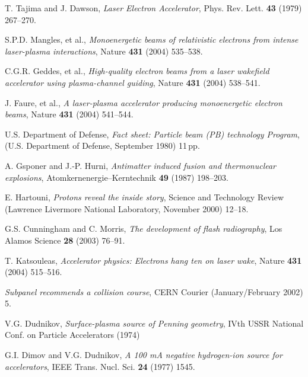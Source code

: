 \documentclass [12pt,a4paper,     ]{report} %
\begin{document}
\begin{enumerate}

   T. Tajima and J. Dawson, \emph{Laser Electron Accelerator}, Phys. Rev. Lett. {\bf 43} (1979) 267--270. 

 S.P.D. Mangles, et al., \emph{Monoenergetic beams of relativistic electrons from intense laser-plasma interactions}, Nature {\bf 431} (2004) 535--538.

 C.G.R. Geddes, et al., \emph{High-quality electron beams from a laser wakefield accelerator using plasma-channel guiding}, Nature {\bf 431} (2004) 538--541.

 J. Faure, et al., \emph{A laser-plasma accelerator producing monoenergetic electron beams}, Nature {\bf 431} (2004) 541--544.



 U.S. Department of Defense, \emph{Fact sheet: Particle beam (PB) technology Program},  (U.S. Department of Defense, September 1980) 11\,pp.

   A. Gsponer and J.-P. Hurni, \emph{Antimatter induced fusion and thermonuclear explosions}, Atomkernenergie--Kerntechnik {\bf 49}  (1987) 198--203.

 E. Hartouni, \emph{Protons reveal the inside story}, Science and Technology Review (Lawrence Livermore National Laboratory, November 2000) 12--18.

 G.S. Cunningham and C. Morris, \emph{The development of flash radiography}, Los Alamos Science {\bf 28} (2003) 76--91.

 T. Katsouleas, \emph{Accelerator physics: Electrons hang ten on laser wake}, Nature {\bf 431} (2004) 515--516.

 \emph{Subpanel recommends a collision course}, CERN Courier (January/February 2002) 5.

 V.G. Dudnikov, \emph{Surface-plasma source of Penning geometry}, IVth USSR National Conf. on Particle Accelerators (1974)

 G.I. Dimov and V.G. Dudnikov, \emph{A 100 mA negative hydrogen-ion source for accelerators}, IEEE Trans. Nucl. Sci. {\bf 24} (1977) 1545.



\end{enumerate}
\end{document}
